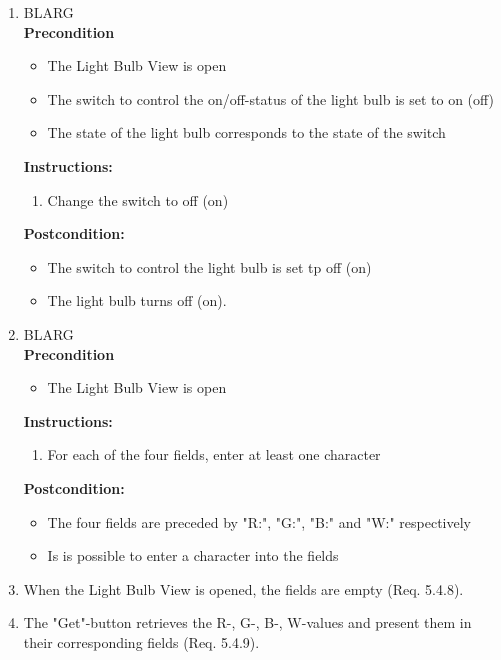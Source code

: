 \documentclass[a4paper]{article}
\newlength{\testlabellength}
\newenvironment{testlist}{\begin{enumerate}[label=\bfseries Instruction \thesubsection.\arabic* , labelindent=0pt, labelwidth=\testlabellength , leftmargin=2cm]}{\end{enumerate}}
\newenvironment{precondition}{
{\color{white}BLARG}\\ 
\textbf{Precondition}
\begin{itemize}[labelindent=0cm, labelwidth=2cm , leftmargin=1cm]
}
{\end{itemize}}
\newenvironment{instruction}{
\textbf{Instructions:}
\begin{enumerate}[label=\bfseries  \arabic*., labelindent=0cm, labelwidth=2cm , leftmargin=1cm]
}
{\end{enumerate}}
\newenvironment{postcondition}{
\textbf{Postcondition:}
\begin{itemize}[labelindent=0cm, labelwidth=2cm , leftmargin=1cm]
}
{\end{itemize}}
\begin{document}
\begin{appendices}
\begin{testlist}
	\item 	\begin{precondition}
				\item The Light Bulb View is open
				\item The switch to control the on/off-status of the light bulb is set to on (off)
				\item The state of the light bulb corresponds to the state of the switch
			\end{precondition}
    		\begin{instruction}
    			\item Change the switch to off (on)
    		\end{instruction}
    		\begin{postcondition}
    			\item The switch to control the light bulb is set tp off (on)
    			\item The light bulb turns off (on).
    		\end{postcondition}
    		
  
    
   	\item 	\begin{precondition}
   				\item The Light Bulb View is open
			\end{precondition}
    		\begin{instruction}
    			\item For each of the four fields, enter at least one character
    		\end{instruction}
    		\begin{postcondition}
    			\item The four fields are preceded by "R:", "G:", "B:" and "W:" respectively
    			\item Is is possible to enter a character into the fields
    		\end{postcondition}

    
	\item When the Light Bulb View is opened, the fields are empty (Req. 5.4.8).

	\item The "Get"-button retrieves the R-, G-, B-, W-values and present them in their corresponding fields (Req. 5.4.9). 


\end{testlist}
\end{appendices}
\end{document}
